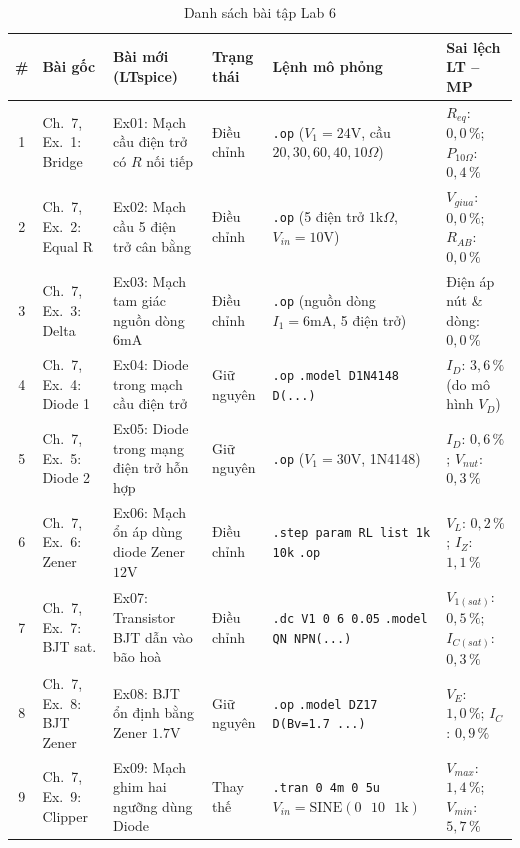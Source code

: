 \documentclass[12pt,a4paper]{article}
\newcommand{\hc}[1]{\cellcolor{navy}\color{white}\sffamily\bfseries\small #1}
\begin{document}
\begin{table}[H]\centering\small
\caption{Danh sách bài tập Lab 6}\label{tab:lab6}
\setlength{\tabcolsep}{3.5pt}
\renewcommand{\arraystretch}{1.2}
\begin{tabular}{|c|p{2.6cm}|p{3.2cm}|p{1.9cm}|p{3.2cm}|p{2.2cm}|}
\hline
\hc{\#} & \hc{Bài gốc} & \hc{Bài mới (LTspice)} & \hc{Trạng thái} & \hc{Lệnh mô phỏng} & \hc{Sai lệch LT -- MP}\\ \hline
1 & Ch.~7, Ex.~1: Bridge & Ex01: Mạch cầu điện trở có $R$ nối tiếp & Điều chỉnh & \texttt{.op} ($V_1=24\text{V}$, cầu $20, 30, 60, 40, 10\Omega$) & $R_{eq}$: $0{,}0\,\%$; $P_{10\Omega}$: $0{,}4\,\%$ \\ \hline
2 & Ch.~7, Ex.~2: Equal R & Ex02: Mạch cầu 5 điện trở cân bằng & Điều chỉnh & \texttt{.op} (5 điện trở $1\text{k}\Omega$, $V_{in}=10\text{V}$) & $V_{giua}$: $0{,}0\,\%$; $R_{AB}$: $0{,}0\,\%$ \\ \hline
3 & Ch.~7, Ex.~3: Delta & Ex03: Mạch tam giác nguồn dòng $6\text{mA}$ & Điều chỉnh & \texttt{.op} (nguồn dòng $I_1=6\text{mA}$, 5 điện trở) & Điện áp nút \& dòng: $0{,}0\,\%$ \\ \hline
4 & Ch.~7, Ex.~4: Diode 1 & Ex04: Diode trong mạch cầu điện trở & Giữ nguyên & \texttt{.op} \newline \texttt{.model D1N4148 D(...)} & $I_D$: $3{,}6\,\%$ (do mô hình $V_D$) \\ \hline
5 & Ch.~7, Ex.~5: Diode 2 & Ex05: Diode trong mạng điện trở hỗn hợp & Giữ nguyên & \texttt{.op} ($V_1=30\text{V}$, 1N4148) & $I_D$: $0{,}6\,\%$; $V_{nut}$: $0{,}3\,\%$ \\ \hline
6 & Ch.~7, Ex.~6: Zener & Ex06: Mạch ổn áp dùng diode Zener $12\text{V}$ & Điều chỉnh & \texttt{.step param RL list 1k 10k} \newline \texttt{.op} & $V_L$: $0{,}2\,\%$; $I_Z$: $1{,}1\,\%$ \\ \hline
7 & Ch.~7, Ex.~7: BJT sat. & Ex07: Transistor BJT dẫn vào bão hoà & Điều chỉnh & \texttt{.dc V1 0 6 0.05} \newline \texttt{.model QN NPN(...)} & $V_{1(sat)}$: $0{,}5\,\%$; $I_{C(sat)}$: $0{,}3\,\%$ \\ \hline
8 & Ch.~7, Ex.~8: BJT Zener & Ex08: BJT ổn định bằng Zener $1.7\text{V}$ & Giữ nguyên & \texttt{.op} \newline \texttt{.model DZ17 D(Bv=1.7 ...)} & $V_E$: $1{,}0\,\%$; $I_C$: $0{,}9\,\%$ \\ \hline
9 & Ch.~7, Ex.~9: Clipper & Ex09: Mạch ghim hai ngưỡng dùng Diode & Thay thế & \texttt{.tran 0 4m 0 5u} \newline $V_{in}=\text{SINE}(0\text{ }10\text{ }1\text{k})$ & $V_{max}$: $1{,}4\,\%$; $V_{min}$: $5{,}7\,\%$ \\ \hline

\end{tabular}
\end{table}
\end{document}
